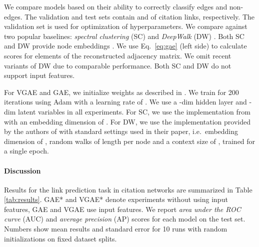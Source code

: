 \documentclass{article}
\begin{document}
We compare models based on their ability to correctly classify edges and non-edges. The validation and test sets contain  and  of citation links, respectively. The validation set is used for optimization of hyperparameters. We compare against two popular baselines: \emph{spectral clustering} (SC) \cite{tang2011leveraging} and \emph{DeepWalk} (DW) \cite{perozzi2014deepwalk}. Both SC and DW provide node embeddings . We use Eq.~\ref{eq:gae} (left side) to calculate scores for elements of the reconstructed adjacency matrix. We omit recent variants of DW \cite{tang2015line, grovernode2vec} due to comparable performance. Both SC and DW do not support input features.

For VGAE and GAE, we initialize weights as described in \cite{glorot2010understanding}. We train for 200 iterations using Adam \cite{kingma2014adam} with a learning rate of . We use a -dim hidden layer and -dim latent variables in all experiments. For SC, we use the implementation from \cite{scikit-learn} with an embedding dimension of . For DW, we use the implementation provided by the authors of \cite{grovernode2vec} with standard settings used in their paper, i.e.~embedding dimension of ,  random walks of length  per node and a context size of , trained for a single epoch.

\paragraph{Discussion}
Results for the link prediction task in citation networks are summarized in Table \ref{tab:results}. GAE* and VGAE* denote experiments without using input features, GAE and VGAE use input features. We report \emph{area under the ROC curve} (AUC) and \emph{average precision} (AP) scores for each model on the test set. Numbers show mean results and standard error for 10 runs with random initializations on fixed dataset splits.
\end{document}
